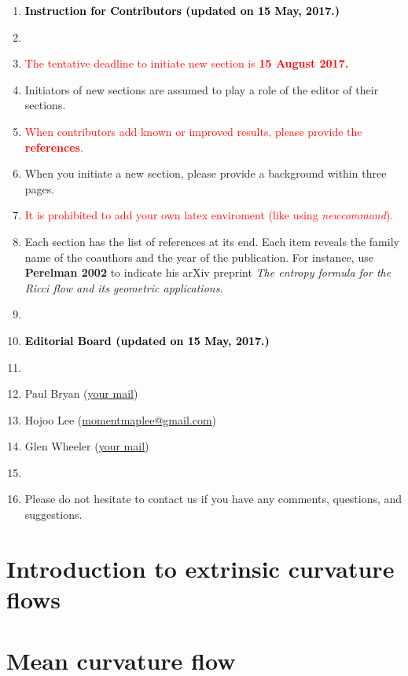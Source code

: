 \documentclass{amsart}
\theoremstyle{definition}
\begin{document}
\begin{enumerate}
\item[] \textbf{\textcolor{black}{Instruction for Contributors (updated on 15 May, 2017.)}}
\item[]
\item {\textcolor{red}{The tentative deadline to initiate new section is \textbf{15 August 2017.}}}
\item Initiators of new sections are assumed to play a role of the editor of their sections.
\item \textcolor{red}{When contributors add known or improved results, please provide the \textbf{references}.} 
\item When you initiate a new section, please provide a background within three pages. 
\item  {\textcolor{red}{It is prohibited to add your own latex enviroment (like using \textit{newcommand}).}} 
\item Each section has the list of references at its end. Each item reveals the family name of the coauthors and the year of the publication.
For instance, use \textbf{Perelman 2002} to indicate his arXiv preprint \emph{The entropy formula for the Ricci flow and its geometric applications}.
\item[]
\item[] \textbf{\textcolor{black}{Editorial Board (updated on 15 May, 2017.)}}
\item[]
\item[] Paul Bryan  (\href{your mail}{your mail}) 
\item[] Hojoo Lee  (\href{momentmaplee@gmail.com}{momentmaplee@gmail.com}) 
\item[] Glen Wheeler  (\href{your mail}{your mail}) 
\item[]
\item[] Please do not hesitate to contact us if you have any comments, questions, and suggestions. 
\end{enumerate}

\section{Introduction to extrinsic curvature flows}
  
\newpage 

\section{Mean curvature flow}
\end{document}
